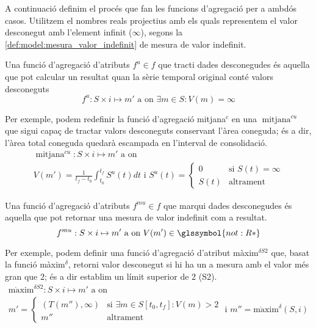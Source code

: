  
A continuació definim el procés que fan les funcions d'agregació per a
ambdós casos. Utilitzem el nombres reals projectius
 amb els quals representem el valor desconegut
amb l'element infinit ($\infty$), segons la
\autoref{def:model:mesura_valor_indefinit} de mesura de valor indefinit.


Una funció d'agregació d'atributs $f^u \in f$ que tracti dades
desconegudes és aquella que pot calcular un resultat quan la sèrie
temporal original conté valors desconeguts
\[
f^u: S \times i \mapsto m' \text{ a on } \exists m \in S: V(m)=\infty
\]

Per exemple, podem redefinir la funció d'agregació mitjana$^c$ en una
$\operatorname{mitjana}^{cu}$ que sigui capaç de tractar valors
desconeguts conservant l'àrea coneguda; és a dir, l'àrea total
coneguda quedarà escampada en l'interval de consolidació.
\begin{gather*}
  \operatorname{mitjana}^{cu}: S \times i \mapsto m' \text{ a on }\\
  V(m') = \frac{1}{t_f-t_0}\int_{t_0}^{t_f} S^u(t)dt \text{ i }
  S^u(t)=
  \begin{cases}
    0 &\text{si }  S(t)=\infty\\
    S(t) & \text{altrament }
  \end{cases}
\end{gather*}



Una funció d'agregació d'atributs $f^{mu} \in f$ que marqui
dades desconegudes és aquella que pot retornar una mesura de valor
indefinit com a resultat.
\[
f^{mu}: S \times i \mapsto m' \text{ a on } V(m')\in \glssymbol{not:R*}
\]


Per exemple, podem definir una funció d'agregació d'atribut
màxim$^{\delta S2}$ que, basat la funció màxim$^\delta$, retorni valor desconegut
si hi ha un a mesura amb el valor més gran que 2; és a dir establim un
límit superior de 2 (S2). 
\begin{gather*}
  \operatorname{m\grave{a}xim}^{\delta S2}: S \times i \mapsto m' \text{ a on }\\
  m' = \begin{cases}
    (T(m''),\infty) &\text{si }  \exists m\in S[t_0,t_f]: V(m)>2\\
    m'' & \text{altrament }
  \end{cases} \text{ i } m''= \operatorname{m\grave{a}xim}^\delta(S,i)
\end{gather*}







